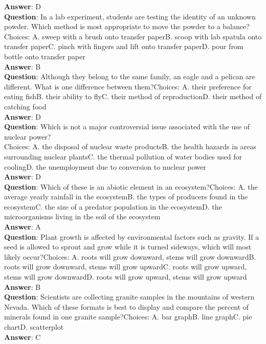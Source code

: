 \textbf{Answer}: D\\
\textbf{Question}: In a lab experiment, students are testing the identity of an unknown powder. Which method is most appropriate to move the powder to a balance?Choices: A. sweep with a brush onto transfer paperB. scoop with lab spatula onto transfer paperC. pinch with fingers and lift onto transfer paperD. pour from bottle onto transfer paper\\
\textbf{Answer}: B\\
\textbf{Question}: Although they belong to the same family, an eagle and a pelican are different. What is one difference between them?Choices: A. their preference for eating fishB. their ability to flyC. their method of reproductionD. their method of catching food\\
\textbf{Answer}: D\\
\textbf{Question}: Which is not a major controversial issue associated with the use of nuclear power?\\
Choices: A. the disposal of nuclear waste productsB. the health hazards in areas surrounding nuclear plantsC. the thermal pollution of water bodies used for coolingD. the unemployment due to conversion to nuclear power\\
\textbf{Answer}: D\\
\textbf{Question}: Which of these is an abiotic element in an ecosystem?Choices: A. the average yearly rainfall in the ecosystemB. the types of producers found in the ecosystemC. the size of a predator population in the ecosystemD. the microorganisms living in the soil of the ecosystem\\
\textbf{Answer}: A\\
\textbf{Question}: Plant growth is affected by environmental factors such as gravity. If a seed is allowed to sprout and grow while it is turned sideways, which will most likely occur?Choices: A. roots will grow downward, stems will grow downwardB. roots will grow downward, stems will grow upwardC. roots will grow upward, stems will grow downwardD. roots will grow upward, stems will grow upward\\
\textbf{Answer}: B\\
\textbf{Question}: Scientists are collecting granite samples in the mountains of western Nevada. Which of these formats is best to display and compare the percent of minerals found in one granite sample?Choices: A. bar graphB. line graphC. pie chartD. scatterplot\\
\textbf{Answer}: C\\
